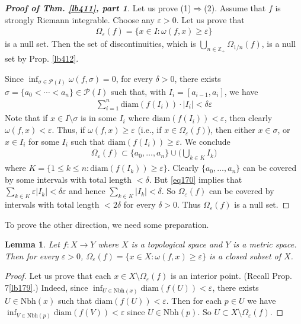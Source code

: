 \documentclass[12pt,b5paper,notitlepage]{article}
\theoremstyle{definition}
\theoremstyle{plain}
\newtheorem{lm}[df]{Lemma}
\newcommand{\mc}{\mathcal}
\newcommand{\Zbb}{\mathbb Z}
\newcommand{\Nbh}{\mathrm{Nbh}}
\newcommand{\diam}{\mathrm{diam}}
\newcommand{\eps}{\varepsilon}
\numberwithin{equation}{section}
\begin{document}
\begin{proof}[\textbf{Proof of Thm. \ref{lb411}, part 1}]
Let us prove (1)$\Rightarrow$(2). Assume that $f$ is strongly Riemann integrable. Choose any $\eps>0$. Let us prove that
\begin{align}
\Omega_\eps(f)=\{x\in I:\omega(f,x)\geq\eps\}\label{eq200}
\end{align}
is a null set. Then the set of discontinuities, which is $\bigcup_{n\in\Zbb_+}\Omega_{1/n}(f)$, is a null set by Prop. \ref{lb412}.

Since $\inf_{\sigma\in\mc P(I)}\omega(f,\sigma)=0$, for every $\delta>0$, there exists $\sigma=\{a_0<\cdots<a_n\}\in\mc P(I)$ such that, with $I_i=[a_{i-1},a_i]$, we have 
\begin{align}
\sum_{i=1}^n \diam(f(I_i))\cdot |I_i|<\delta\eps\label{eq170}
\end{align}
Note that if $x\in I\setminus\sigma$ is in some $I_i$ where $\diam(f(I_i))<\eps$, then clearly $\omega(f,x)<\eps$. Thus, if $\omega(f,x)\geq \eps$ (i.e., if $x\in\Omega_\eps(f)$), then either $x\in\sigma$, or $x\in I_i$ for some $I_i$ such that $\diam(f(I_i))\geq\eps$. We conclude
\begin{align*}
\Omega_\eps(f)\subset\{a_0,\dots,a_n\}\cup\Big(\bigcup_{k\in K}I_k\Big)
\end{align*}
where $K=\{1\leq k\leq n:\diam(f(I_k))\geq\eps\}$. Clearly $\{a_0,\dots,a_n\}$ can be covered by some intervals with total length $<\delta$. But \eqref{eq170} implies that $\sum_{k\in K}\eps|I_k|<\delta\eps$ and hence $\sum_{k\in K}|I_k|<\delta$. So $\Omega_\eps(f)$ can be covered by intervals with total length $<2\delta$ for every $\delta>0$. Thus $\Omega_\eps(f)$ is a null set.
\end{proof}


To prove the other direction, we need some preparation.


\begin{lm}\label{lb414}
Let $f:X\rightarrow Y$ where $X$ is a topological space and $Y$ is a metric space. Then for every $\eps>0$, $\Omega_\eps(f)=\{x\in X:\omega(f,x)\geq\eps\}$ is a closed subset of $X$.
\end{lm}

\begin{proof}
Let us prove that each $x\in X\setminus\Omega_\eps(f)$ is an interior point. (Recall Prop. 7\ref{lb179}.) Indeed, since $\inf_{U\in\Nbh(x)}\diam(f(U))<\eps$, there exists $U\in\Nbh(x)$ such that $\diam(f(U))<\eps$. Then for each $p\in U$ we have $\inf_{V\in\Nbh(p)}\diam(f(V))<\eps$ since $U\in\Nbh(p)$. So $U\subset X\setminus\Omega_\eps(f)$.
\end{proof}
\end{document}

